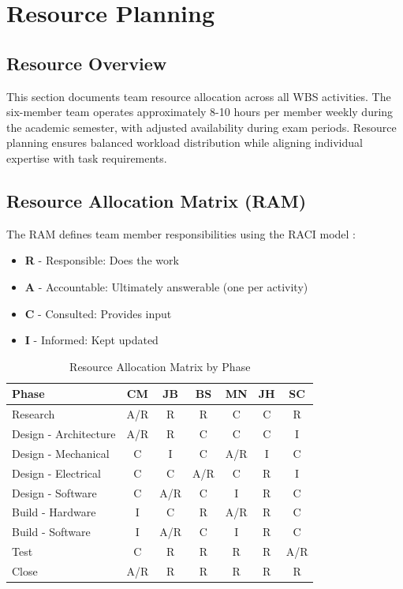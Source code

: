 
\section{Resource Planning}\label{sec:resource_planning}

\subsection{Resource Overview}

This section documents team resource allocation across all WBS activities. The six-member team operates approximately 8-10 hours per member weekly during the academic semester, with adjusted availability during exam periods. Resource planning ensures balanced workload distribution while aligning individual expertise with task requirements.

\subsection{Resource Allocation Matrix (RAM)}

The RAM defines team member responsibilities using the RACI model \parencite{pmi_raci}:

\begin{itemize}
    \item \textbf{R} - Responsible: Does the work
    \item \textbf{A} - Accountable: Ultimately answerable (one per activity)
    \item \textbf{C} - Consulted: Provides input
    \item \textbf{I} - Informed: Kept updated
\end{itemize}

\begin{table}[H]
\centering
\caption{Resource Allocation Matrix by Phase}
\label{tab:ram}
\begin{tabular}{@{}l*{6}{c}@{}}
\toprule
\textbf{Phase} & \textbf{CM} & \textbf{JB} & \textbf{BS} & \textbf{MN} & \textbf{JH} & \textbf{SC} \\
\midrule
Research & A/R & R & R & C & C & R \\
Design - Architecture & A/R & R & C & C & C & I \\
Design - Mechanical & C & I & C & A/R & I & C \\
Design - Electrical & C & C & A/R & C & R & I \\
Design - Software & C & A/R & C & I & R & C \\
Build - Hardware & I & C & R & A/R & R & C \\
Build - Software & I & A/R & C & I & R & C \\
Test & C & R & R & R & R & A/R \\
Close & A/R & R & R & R & R & R \\
\bottomrule
\end{tabular}
\end{table}

